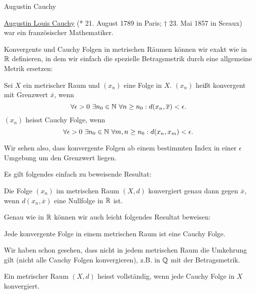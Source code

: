 \begin{emphBox}{Augustin Cauchy}{}

\href{https://de.wikipedia.org/wiki/Augustin-Louis\_Cauchy}{Augustin Louis Cauchy} (* 21. August 1789 in Paris; † 23. Mai 1857 in Sceaux) war ein französischer Mathematiker.
\end{emphBox}

Konvergente und Cauchy Folgen in metrischen Räumen können wir exakt wie in \(\mathbb{R}\) definieren, in dem wir einfach die spezielle Betragsmetrik durch eine allgemeine Metrik ersetzen:
\label{metrik/konvfolgen:definition-4}
\begin{definition}{}{}



Sei \(X\) ein metrischer Raum und \((x_n)\) eine Folge in \(X\). \((x_n)\) heißt konvergent mit Grenzwert \(\overline{x}\), wenn
\begin{equation*}
 \forall \epsilon  >0 ~\exists n_0 \in \mathbb{N} ~\forall n \geq n_0: d(x_n, \overline{x}) < \epsilon.
\end{equation*}
\((x_n)\) heisst Cauchy Folge, wenn
\begin{equation*}
 \forall \epsilon  >0 ~\exists n_0 \in \mathbb{N} ~\forall m,n \geq n_0: d(x_n, x_m) < \epsilon.
\end{equation*}\end{definition}

Wir sehen also, dass konvergente Folgen ab einem bestimmten Index in einer \(\epsilon\) Umgebung um den Grenzwert liegen.

Es gilt folgendes einfach zu beweisende Resultat:
\label{metrik/konvfolgen:nullfolgenmetrik}
\begin{lemma}{}{}



Die Folge \((x_n)\) im metrischen Raum \((X,d)\) konvergiert genau dann gegen \(\overline{x}\), wenn \(d(x_n,\overline{x})\) eine Nullfolge in \(\mathbb{R}\) ist.
\end{lemma}

Genau wie in \(\mathbb{R}\) können wir auch leicht folgendes Resultat beweisen:
\label{metrik/konvfolgen:theorem-6}
\begin{theorem}{}{}



Jede konvergente Folge in einem metrischen Raum ist eine Cauchy Folge.
\end{theorem}

Wir haben schon gesehen, dass nicht in jedem metrischen Raum die Umkehrung gilt (nicht alle Cauchy Folgen konvergieren), z.B. in \(\mathbb{Q}\) mit der Betragsmetrik.
\label{metrik/konvfolgen:definition-7}
\begin{definition}{}{}



Ein metrischer Raum \((X,d)\) heisst vollständig, wenn jede Cauchy Folge in \(X\) konvergiert.
\end{definition}


